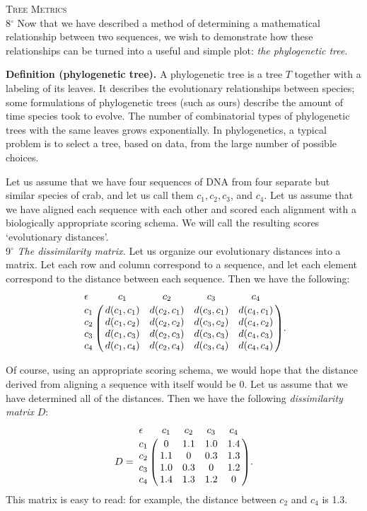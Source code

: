 \documentclass[a4paper]{article}
\begin{document}
\textsc{Tree Metrics} \\

8$^\circ$ Now that we have described a method of determining a mathematical relationship between two sequences, we wish to demonstrate how these relationships can be turned into a useful and simple plot: \emph{the phylogenetic tree}. \\

\begin{adjustwidth}{.5in}{0pt}
\textbf{Definition (phylogenetic tree).} A phylogenetic tree is a tree $T$ together with a labeling of its leaves. It describes the evolutionary relationships between species; some formulations of phylogenetic trees (such as ours) describe the amount of time species took to evolve. The number of combinatorial types of phylogenetic trees with the same leaves grows exponentially. In phylogenetics, a typical problem is to select a tree, based on data, from the large number of possible choices. \\
\end{adjustwidth}

Let us assume that we have four sequences of DNA from four separate but similar species of crab, and let us call them $c_1, c_2, c_3$, and $c_4$. Let us assume that we have aligned each sequence with each other and scored each alignment with a biologically appropriate scoring schema. We will call the resulting scores `evolutionary distances'. \\


9$^\circ$ \emph{The dissimilarity matrix.} Let us organize our evolutionary distances into a matrix. Let each row and column correspond to a sequence, and let each element correspond to the distance between each sequence. Then we have the following:
\[ \bordermatrix{ \epsilon & c_1 & c_2 & c_3 & c_4 \cr
c_1 & d(c_1,c_1) & d(c_2,c_1) & d(c_3,c_1) & d(c_4,c_1) \cr
c_2 & d(c_1,c_2) & d(c_2,c_2) & d(c_3,c_2) & d(c_4,c_2) \cr
c_3 & d(c_1,c_3) & d(c_2,c_3) & d(c_3,c_3) & d(c_4,c_3) \cr
c_4 & d(c_1,c_4) & d(c_2,c_4) & d(c_3,c_4) & d(c_4,c_4) \cr }. \]

Of course, using an appropriate scoring schema, we would hope that the distance derived from aligning a sequence with itself would be 0. Let us assume that we have determined all of the distances. Then we have the following \emph{dissimilarity matrix} $D$:
\[ D = \bordermatrix{ \epsilon & c_1 & c_2 & c_3 & c_4 \cr
c_1 & 0 & 1.1 & 1.0 & 1.4 \cr
c_2 & 1.1 & 0 & 0.3 & 1.3 \cr
c_3 & 1.0 & 0.3 & 0 & 1.2 \cr
c_4 & 1.4 & 1.3 & 1.2 & 0 \cr
}. \]
This matrix is easy to read: for example, the distance between $c_2$ and $c_4$ is 1.3. \\
\end{document}
